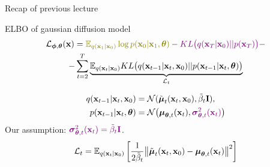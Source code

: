 \begin{frame}{Recap of previous lecture}
	\begin{block}{ELBO of gaussian diffusion model}
		\vspace{-0.7cm}
		\begin{multline*}
			\cL_{\bphi, \btheta}(\bx) =  {\color{olive}\bbE_{q(\bx_1 | \bx_0)} \log p(\bx_0 | \bx_1, \btheta)} - {\color{violet}KL\bigl(q(\bx_T | \bx_0) || p(\bx_T)\bigr)} - \\
			- \sum_{t=2}^T  \underbrace{ \bbE_{q(\bx_t | \bx_0)}KL \bigl(q(\bx_{t-1} | \bx_t, \bx_0) || p(\bx_{t - 1} | \bx_t, \btheta )\bigr)}_{\cL_t}
		\end{multline*}
		\vspace{-1.0cm}
	\end{block}
	\begin{align*}
		q(\mathbf{x}_{t-1} | \mathbf{x}_t, \mathbf{x}_0) &= \mathcal{N}(\tilde{\boldsymbol{\mu}}_t(\mathbf{x}_t, \mathbf{x}_0), \tilde{\beta}_t \mathbf{I}), \\
		p(\mathbf{x}_{t - 1} | \mathbf{x}_t, \boldsymbol{\theta}) &= \mathcal{N} \bigl(\boldsymbol{\mu}_{\boldsymbol{\theta}, t}(\mathbf{x}_t), {\color{violet}\boldsymbol{\sigma}_{\boldsymbol{\theta}, t}^2(\mathbf{x}_t)}\bigr)
	\end{align*}
	Our assumption:	${\color{violet}\boldsymbol{\sigma}_{\boldsymbol{\theta}, t}^2(\mathbf{x}_t) = \tilde{\beta}_t \mathbf{I}}$.
	\[
		\mathcal{L}_t = \mathbb{E}_{q(\mathbf{x}_t | \mathbf{x}_0)} \left[\frac{1}{2\tilde{\beta}_t} \bigl\| \tilde{\boldsymbol{\mu}}_t(\mathbf{x}_t, \mathbf{x}_0) - \boldsymbol{\mu}_{\boldsymbol{\theta}, t}(\mathbf{x}_t) \bigr\|^2  \right]
	\]
\end{frame}
